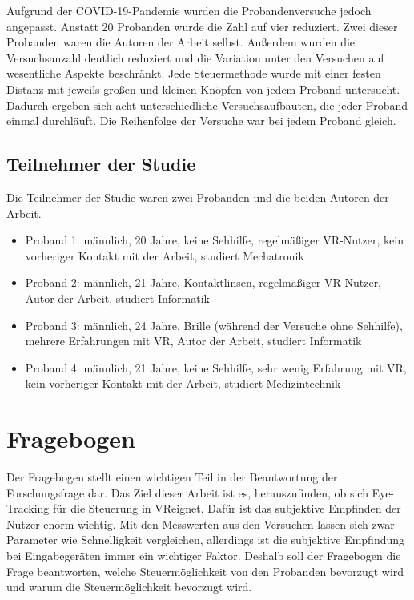 Aufgrund der \ac{COVID-19}-Pandemie wurden die Probandenversuche jedoch angepasst. Anstatt 20 Probanden wurde die Zahl auf vier reduziert. Zwei dieser Probanden waren die Autoren der Arbeit selbst. Außerdem wurden die Versuchsanzahl deutlich reduziert und die Variation unter den Versuchen auf wesentliche Aspekte beschränkt. Jede Steuermethode wurde mit einer festen Distanz mit jeweils großen und kleinen Knöpfen von jedem Proband untersucht. Dadurch ergeben sich acht unterschiedliche Versuchsaufbauten, die jeder Proband einmal durchläuft. Die Reihenfolge der Versuche war bei jedem Proband gleich. 

\subsection{Teilnehmer der Studie}
Die Teilnehmer der Studie waren zwei Probanden und die beiden Autoren der Arbeit.
\begin{itemize}
	\item Proband 1: männlich, 20 Jahre, keine Sehhilfe, regelmäßiger VR-Nutzer, kein vorheriger Kontakt mit der Arbeit, studiert Mechatronik
	\item Proband 2: männlich, 21 Jahre, Kontaktlinsen, regelmäßiger VR-Nutzer, Autor der Arbeit, studiert Informatik
	\item Proband 3: männlich, 24 Jahre, Brille (während der Versuche ohne Sehhilfe), mehrere Erfahrungen mit VR, Autor der Arbeit, studiert Informatik
	\item Proband 4: männlich, 21 Jahre, keine Sehhilfe, sehr wenig Erfahrung mit VR, kein vorheriger Kontakt mit der Arbeit, studiert Medizintechnik
\end{itemize}

\section{Fragebogen} 
\label{section:fragebogen}
Der Fragebogen stellt einen wichtigen Teil in der Beantwortung der Forschungsfrage dar. Das Ziel dieser Arbeit ist es, herauszufinden, ob sich Eye-Tracking für die Steuerung in \ac{VR}eignet. Dafür ist das subjektive Empfinden der Nutzer enorm wichtig. Mit den Messwerten aus den Versuchen lassen sich zwar Parameter wie Schnelligkeit vergleichen, allerdings ist die subjektive Empfindung bei Eingabegeräten immer ein wichtiger Faktor. Deshalb soll der Fragebogen die Frage beantworten, welche Steuermöglichkeit von den Probanden bevorzugt wird und warum die Steuermöglichkeit bevorzugt wird.

